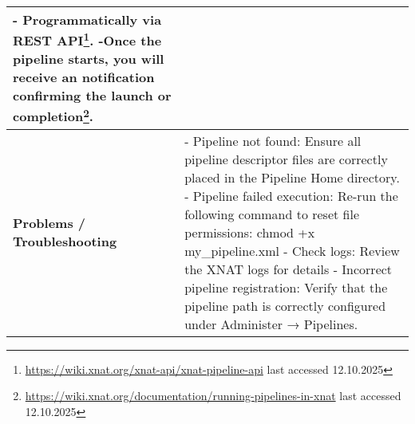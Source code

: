 \begin{table}[H]
\begin{tabular}{|l|p{9cm}|}
   - Programmatically via REST API\footnote{\url{https://wiki.xnat.org/xnat-api/xnat-pipeline-api} last accessed 12.10.2025}.\newline
   -Once the pipeline starts, you will receive an notification confirming the launch or completion\footnote{\url{https://wiki.xnat.org/documentation/running-pipelines-in-xnat} last accessed 12.10.2025}. 
   \\
  \hline
  \textbf{Problems / Troubleshooting} & 
  - Pipeline not found:\newline
    Ensure all pipeline descriptor files are correctly placed in the Pipeline Home directory. \newline
  - Pipeline failed execution:
   Re-run the following command to reset file permissions:\newline
    chmod +x my\_pipeline.xml
  - Check logs: Review the XNAT logs for details\newline
  - Incorrect pipeline registration: Verify that the pipeline path is correctly configured under Administer → Pipelines.
  
  \\
  \hline
  \end{tabular}
\end{table}